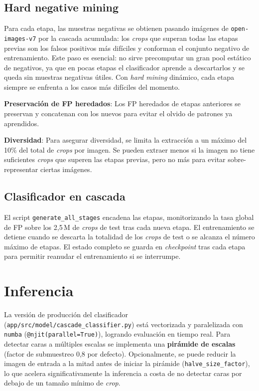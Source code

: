\documentclass[11pt,spanish,listoffigures,listoftables]{tfgetsinf}
\begin{document}
\subsection{Hard negative mining}
Para cada etapa, las muestras negativas se obtienen pasando imágenes de \texttt{open-images-v7} por la cascada acumulada: los \textit{crops} que superan todas las etapas previas son los falsos positivos más difíciles y conforman el conjunto negativo de entrenamiento. Este paso es esencial: no sirve precomputar un gran pool estático de negativos, ya que en pocas etapas el clasificador aprende a descartarlos y se queda sin muestras negativas útiles. Con \textit{hard mining} dinámico, cada etapa siempre se enfrenta a los casos más difíciles del momento.

\textbf{Preservación de FP heredados}: Los FP heredados de etapas anteriores se preservan y concatenan con los nuevos para evitar el olvido de patrones ya aprendidos. 

\textbf{Diversidad}: Para asegurar diversidad, se limita la extracción a un máximo del 10\% del total de \textit{crops} por imagen. Se pueden extraer menos si la imagen no tiene suficientes \textit{crops} que superen las etapas previas, pero no más para evitar sobre-representar ciertas imágenes.

\subsection{Clasificador en cascada}
El script \texttt{generate\_all\_stages} encadena las etapas, monitorizando la tasa global de FP sobre los 2,5\,M de \textit{crops} de test tras cada nueva etapa. El entrenamiento se detiene cuando se descarta la totalidad de los \textit{crops} de test o se alcanza el número máximo de etapas. El estado completo se guarda en \textit{checkpoint} tras cada etapa para permitir reanudar el entrenamiento si se interrumpe.

\section{Inferencia}
La versión de producción del clasificador (\texttt{app/src/model/cascade\_classifier.py}) está vectorizada y paralelizada con \texttt{numba} (\texttt{@njit(parallel=True)}), logrando evaluación en tiempo real. Para detectar caras a múltiples escalas se implementa una \textbf{pirámide de escalas} (factor de submuestreo 0,8 por defecto). Opcionalmente, se puede reducir la imagen de entrada a la mitad antes de iniciar la pirámide (\texttt{halve\_size\_factor}), lo que acelera significativamente la inferencia a costa de no detectar caras por debajo de un tamaño mínimo de \textit{crop}. 
\end{document}
